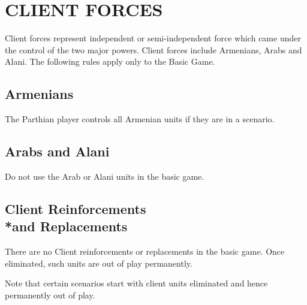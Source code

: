 \section{CLIENT FORCES}

Client forces represent independent or semi-independent force which came under the control of the two major powers. Client forces include Armenians, Arabs and Alani. The following rules apply only to the Basic Game.

\subsection{Armenians}

The Parthian player controls all Armenian units if they are in a scenario.

\subsection{Arabs and Alani}

Do not use the Arab or Alani units in the basic game.

\subsection{Client Reinforcements\\*and Replacements}

There are no Client reinforcements or replacements in the basic game. Once eliminated, such units are out of play permanently.

Note that certain scenarios start with client units eliminated and hence permanently out of play.